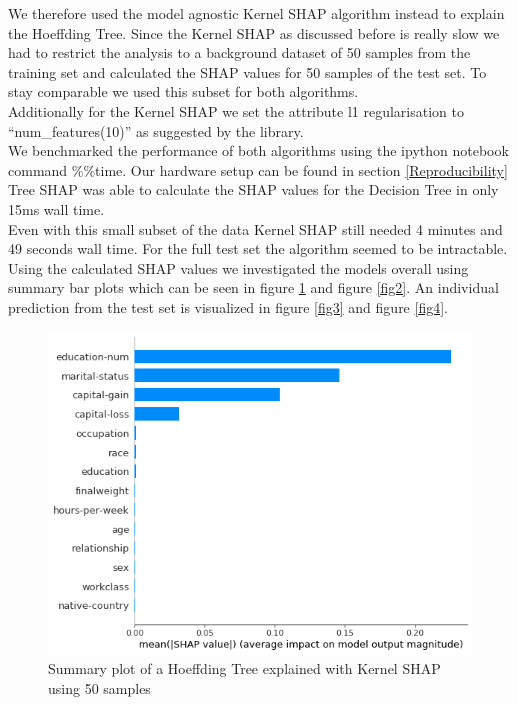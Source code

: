 \documentclass[conference]{IEEEtran}
\begin{document}
We therefore used the model agnostic Kernel SHAP algorithm instead to explain the Hoeffding Tree.
Since the Kernel SHAP as discussed before is really slow we had to restrict the analysis to a background dataset of 50 samples from the training set and calculated the SHAP values for 50 samples of the test set. To stay comparable we used this subset for both algorithms.\\
Additionally for the Kernel SHAP we set the attribute l1 regularisation to ``num\_features(10)'' as suggested by the library.\\
We benchmarked the performance of both algorithms using the ipython notebook command \%\%time. Our hardware setup can be found in section \ref{Reproducibility}\\
Tree SHAP was able to calculate the SHAP values for the Decision Tree in only 15ms wall time.\\
Even with this small subset of the data Kernel SHAP still needed 4 minutes and 49 seconds wall time.
For the full test set the algorithm seemed to be intractable.\\
Using the calculated SHAP values we investigated the models overall using summary bar plots which can be seen in figure \ref{fig1} and figure \ref{fig2}. An individual prediction from the test set is visualized in figure \ref{fig3} and figure \ref{fig4}.\\

\begin{figure}[htbp]
\centerline{
	\includegraphics[width=\linewidth]{../fig/ex_01_KernelShap_HoeffdingTree_50_Samples_SummaryPlot.png}
}
\caption{Summary plot of a Hoeffding Tree explained with Kernel SHAP using 50 samples}
\label{fig1}
\end{figure}
\end{document}
